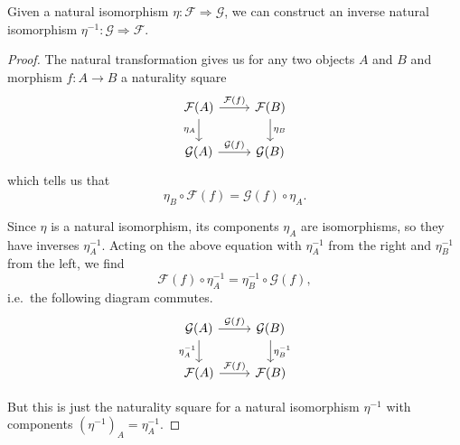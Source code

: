 \documentclass[notes.tex]{subfiles}
\begin{document}
\begin{lemma}
  \label{lemma:naturalisomorphismshaveinverses}
  Given a natural isomorphism $\eta\colon \mathcal{F} \Rightarrow \mathcal{G}$, we can construct an inverse natural isomorphism $\eta^{-1}\colon \mathcal{G} \Rightarrow \mathcal{F}$.
\end{lemma}
\begin{proof}
  The natural transformation gives us for any two objects $A$ and $B$ and morphism $f\colon A \to B$ a naturality square
  \begin{equation*}
    \begin{tikzcd}
      \mathcal{F}(A)
      \arrow[r, "\mathcal{F}(f)"]
      \arrow[d, swap, "\eta_{A}"]
      & \mathcal{F}(B)
      \arrow[d, "\eta_{B}"]
      \\
      \mathcal{G}(A)
      \arrow[r, "\mathcal{G}(f)"]
      & \mathcal{G}(B)
    \end{tikzcd}
  \end{equation*}
  which tells us that
  \begin{equation*}
    \eta_{B} \circ \mathcal{F}(f) = \mathcal{G}(f) \circ \eta_{A}.
  \end{equation*}

  Since $\eta$ is a natural isomorphism, its components $\eta_{A}$ are isomorphisms, so they have inverses $\eta_{A}^{-1}$. Acting on the above equation with $\eta_{A}^{-1}$ from the right and $\eta_{B}^{-1}$ from the left, we find
  \begin{equation*}
    \mathcal{F}(f) \circ \eta_{A}^{-1} = \eta_{B}^{-1} \circ \mathcal{G}(f),
  \end{equation*}
  i.e.\ the following diagram commutes.
  \begin{equation*}
    \begin{tikzcd}
      \mathcal{G}(A)
      \arrow[r, "\mathcal{G}(f)"]
      \arrow[d, swap, "\eta_{A}^{-1}"]
      & \mathcal{G}(B)
      \arrow[d, "\eta_{B}^{-1}"]
      \\
      \mathcal{F}(A)
      \arrow[r, "\mathcal{F}(f)"]
      & \mathcal{F}(B)
    \end{tikzcd}
  \end{equation*}

  But this is just the naturality square for a natural isomorphism $\eta^{-1}$ with components ${(\eta^{-1})}_{A} = \eta_{A}^{-1}$.
\end{proof}
\end{document}
